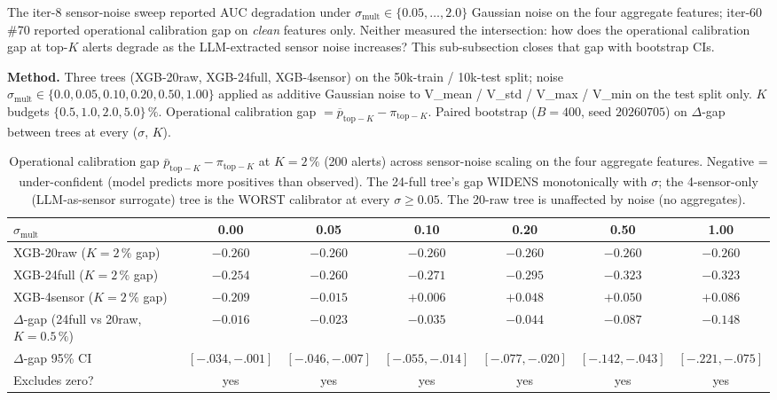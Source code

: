 The iter-8 sensor-noise sweep reported AUC degradation under
$\sigma_{\mathrm{mult}} \in \{0.05, \ldots, 2.0\}$ Gaussian noise on the
four aggregate features; iter-60 \#70 reported operational calibration
gap on \emph{clean} features only. Neither measured the intersection:
how does the operational calibration gap at top-$K$ alerts degrade as
the LLM-extracted sensor noise increases? This sub-subsection closes
that gap with bootstrap CIs.

\noindent\textbf{Method.} Three trees (XGB-20raw, XGB-24full,
XGB-4sensor) on the 50k-train / 10k-test split; noise
$\sigma_{\mathrm{mult}} \in \{0.0, 0.05, 0.10, 0.20, 0.50, 1.00\}$
applied as additive Gaussian noise to V\_mean / V\_std / V\_max / V\_min
on the test split only. $K$ budgets $\{0.5, 1.0, 2.0, 5.0\}\,\%$.
Operational calibration gap $= \overline{p}_{\mathrm{top-}K} -
\pi_{\mathrm{top-}K}$. Paired bootstrap ($B{=}400$, seed $20260705$)
on $\Delta$-gap between trees at every ($\sigma$, $K$).

\begin{table}[t]
\centering\small
\caption{Operational calibration gap
$\bar p_{\mathrm{top-}K} - \pi_{\mathrm{top-}K}$ at $K{=}2\,\%$
(200 alerts) across sensor-noise scaling on the four aggregate
features. Negative = under-confident (model predicts more positives
than observed). The 24-full tree's gap WIDENS monotonically with
$\sigma$; the 4-sensor-only (LLM-as-sensor surrogate) tree is the
WORST calibrator at every $\sigma \geq 0.05$. The 20-raw tree is
unaffected by noise (no aggregates).}
\label{tab:p8-calib-noise}
\begin{tabular}{lcccccc}
\toprule
$\sigma_{\mathrm{mult}}$ & 0.00 & 0.05 & 0.10 & 0.20 & 0.50 & 1.00 \\
\midrule
XGB-20raw  ($K{=}2\,\%$ gap)  & $-0.260$ & $-0.260$ & $-0.260$ & $-0.260$ & $-0.260$ & $-0.260$ \\
XGB-24full ($K{=}2\,\%$ gap)  & $-0.254$ & $-0.260$ & $-0.271$ & $-0.295$ & $-0.323$ & $-0.323$ \\
XGB-4sensor ($K{=}2\,\%$ gap) & $-0.209$ & $-0.015$ & $+0.006$ & $+0.048$ & $+0.050$ & $+0.086$ \\
\midrule
$\Delta$-gap (24full vs 20raw, $K{=}0.5\,\%$) & $-0.016$ & $-0.023$ & $-0.035$ & $-0.044$ & $-0.087$ & $-0.148$ \\
$\Delta$-gap 95\% CI & $[-.034, -.001]$ & $[-.046, -.007]$ & $[-.055, -.014]$ & $[-.077, -.020]$ & $[-.142, -.043]$ & $[-.221, -.075]$ \\
Excludes zero? & yes & yes & yes & yes & yes & yes \\
\bottomrule
\end{tabular}
\end{table}

